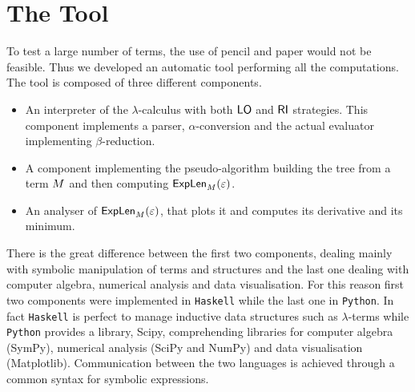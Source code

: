 \section{The Tool}
To test a large number of terms, the use of pencil and paper would not be feasible. Thus we developed an automatic tool performing all the computations. The tool is composed of three different components.
\begin{itemize}
	\item An interpreter of the $\lambda$-calculus with both $\textsf{LO}$ and $\textsf{RI}$ strategies. This component implements a parser, $\alpha$-conversion and the actual evaluator implementing $\beta$-reduction.
	\item A component implementing the pseudo-algorithm building the tree from a term $M$ and then computing $\textsf{ExpLen}_{M}(\varepsilon)$.
	\item An analyser of $\textsf{ExpLen}_{M}(\varepsilon)$, that plots it and computes its derivative and its minimum. 
\end{itemize}
There is the great difference between the first two components, dealing mainly with symbolic manipulation of terms and structures and the last one dealing with computer algebra, numerical analysis and data visualisation. For this reason first two components were implemented in \texttt{Haskell} while the last one in \texttt{Python}. In fact \texttt{Haskell} is perfect to manage inductive data structures such as $\lambda$-terms while \texttt{Python} provides a library, \textsf{Scipy}, comprehending libraries for computer algebra (\textsf{SymPy}), numerical analysis (\textsf{SciPy} and \textsf{NumPy}) and data visualisation (\textsf{Matplotlib}). Communication between the two languages is achieved through a common syntax for symbolic expressions.
